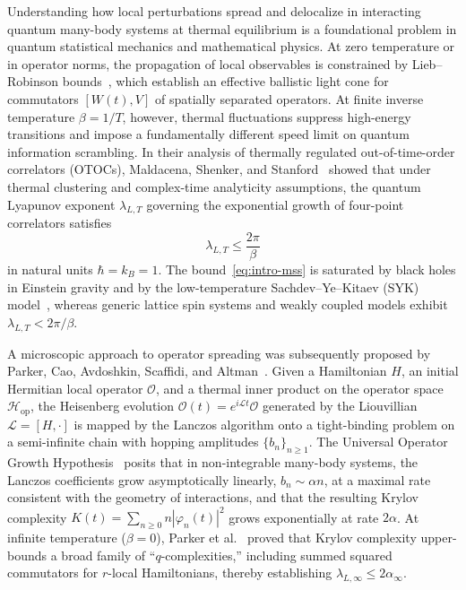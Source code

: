 \documentclass[11pt,a4paper]{article}
\numberwithin{equation}{section}
\theoremstyle{plain}
\theoremstyle{definition}
\newcommand{\Hop}{\mathcal{H}_{\mathrm{op}}}
\begin{document}
Understanding how local perturbations spread and delocalize in interacting quantum many-body systems at thermal equilibrium is a foundational problem in quantum statistical mechanics and mathematical physics. At zero temperature or in operator norms, the propagation of local observables is constrained by Lieb--Robinson bounds~\cite{Lieb1972,Hastings2006,Nachtergaele2006}, which establish an effective ballistic light cone for commutators $[W(t),V]$ of spatially separated operators. At finite inverse temperature $\beta = 1/T$, however, thermal fluctuations suppress high-energy transitions and impose a fundamentally different speed limit on quantum information scrambling. In their analysis of thermally regulated out-of-time-order correlators (OTOCs), Maldacena, Shenker, and Stanford~\cite{MSS2016} showed that under thermal clustering and complex-time analyticity assumptions, the quantum Lyapunov exponent $\lambda_{L,T}$ governing the exponential growth of four-point correlators satisfies
\begin{equation}\label{eq:intro-mss}
  \lambda_{L,T} \le \frac{2\pi}{\beta}
\end{equation}
in natural units $\hbar = k_B = 1$. The bound~\eqref{eq:intro-mss} is saturated by black holes in Einstein gravity and by the low-temperature Sachdev--Ye--Kitaev (SYK) model~\cite{MS2016}, whereas generic lattice spin systems and weakly coupled models exhibit $\lambda_{L,T} < 2\pi/\beta$.

A microscopic approach to operator spreading was subsequently proposed by Parker, Cao, Avdoshkin, Scaffidi, and Altman~\cite{Parker2019}. Given a Hamiltonian $H$, an initial Hermitian local operator $\mathcal{O}$, and a thermal inner product on the operator space $\Hop$, the Heisenberg evolution $\mathcal{O}(t) = e^{i\mathcal{L}t}\mathcal{O}$ generated by the Liouvillian $\mathcal{L} = [H,\cdot]$ is mapped by the Lanczos algorithm onto a tight-binding problem on a semi-infinite chain with hopping amplitudes $\{b_n\}_{n\ge 1}$. The Universal Operator Growth Hypothesis~\cite{Parker2019} posits that in non-integrable many-body systems, the Lanczos coefficients grow asymptotically linearly, $b_n \sim \alpha n$, at a maximal rate consistent with the geometry of interactions, and that the resulting Krylov complexity $K(t) = \sum_{n\ge 0} n|\varphi_n(t)|^2$ grows exponentially at rate $2\alpha$. At infinite temperature ($\beta=0$), Parker et al.~\cite{Parker2019} proved that Krylov complexity upper-bounds a broad family of ``$q$-complexities,'' including summed squared commutators for $r$-local Hamiltonians, thereby establishing $\lambda_{L,\infty} \le 2\alpha_\infty$.
\end{document}

